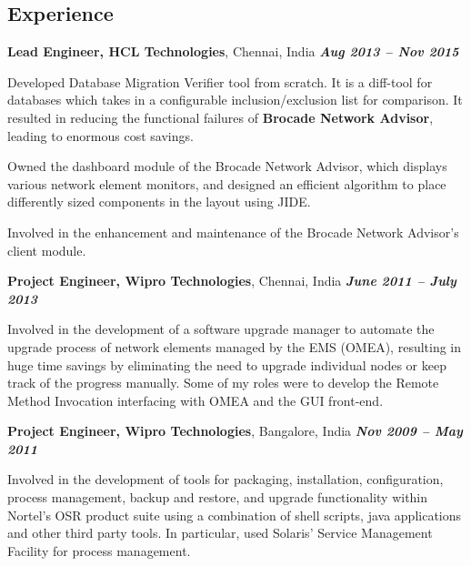 \documentclass[margin]{resume}
\begin{document}
\begin{resume}
\section{\mysidestyle Experience}
\textbf{Lead Engineer, HCL Technologies}, Chennai, India \hfill \textbf{\textit{Aug 2013 -- Nov 2015}}\\
\vspace{-10pt}
\begin{list2}
\item Developed Database Migration Verifier tool from scratch. It is a
diff-tool for databases which takes in a configurable inclusion/exclusion list
for comparison. It resulted in reducing the functional failures of
\textbf{Brocade Network Advisor}, leading to enormous cost savings.
\item Owned the dashboard module of the Brocade Network Advisor, which displays
various network element monitors, and designed an efficient algorithm to place
differently sized components in the layout using JIDE.
\item Involved in the enhancement and maintenance of the Brocade Network
Advisor's client module.
\end{list2}
	
\textbf{Project Engineer, Wipro Technologies}, Chennai, India \hfill \textbf{\textit{June 2011 -- July 2013}}\\
\vspace{-10pt}
\begin{list2}\item
Involved in the development of a software upgrade manager to automate the
upgrade process of network elements managed by the EMS (OMEA), resulting in
huge time savings by eliminating the need to upgrade individual nodes or keep
track of the progress manually. Some of my roles were to develop the Remote
Method Invocation interfacing with OMEA and the GUI front-end.
\end{list2}

\textbf{Project Engineer, Wipro Technologies}, Bangalore, India \hfill \textbf{\textit{Nov 2009 -- May 2011}}\\
\vspace{-10pt}
\begin{list2}\item
Involved in the development of tools for packaging, installation,
configuration, process management, backup and restore, and upgrade
functionality within Nortel's OSR product suite using a combination of shell
scripts, java applications and other third party tools. In particular, used
Solaris' Service Management Facility for process management.
\end{list2}


\end{resume}
\end{document}
